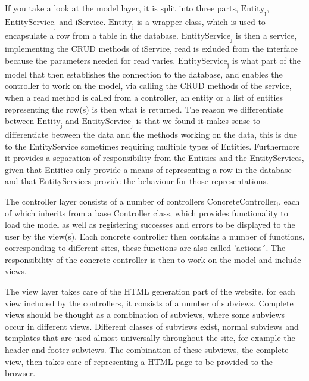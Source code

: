 \begin{description}[style=nextline]
	\item[Model Layer] 
	If you take a look at the model layer, it is split into three parts, $\text{Entity}_\text{j}$, $\text{EntityService}_\text{j}$ and iService.
	$\text{Entity}_\text{j}$ is a wrapper class, which is used to encapsulate a row from a table in the database.
	$\text{EntityService}_\text{j}$ is then a service, implementing the CRUD methods of iService, read is exluded from the interface because the parameters needed for read varies.
	$\text{EntityService}_\text{j}$ is what part of the model that then establishes the connection to the database, and enables the controller to work on the model, via calling the CRUD methods of the service, when a read method is called from a controller, an entity or a list of entities representing the row(s) is then what is returned.
	The reason we differentiate between  $\text{Entity}_\text{j}$ and $\text{EntityService}_\text{j}$ is that we found it makes sense to differentiate between the data and the methods working on the data, this is due to the EntityService sometimes requiring multiple types of Entities. 
    Furthermore it provides a separation of responsibility from the Entities and the EntityServices, given that Entities only provide a means of representing a row in the database and that EntityServices provide the behaviour for those representations.
	
	\item[Controller Layer]
	The controller layer consists of a number of controllers $\text{ConcreteController}_\text{i}$, each of which inherits from a base Controller class, which provides functionality to load the model as well as registering successes and errors to be displayed to the user by the view(s).
	Each concrete controller then contains a number of functions, corresponding to different sites, these functions are also called 'actions´. 
    The responsibility of the concrete controller is then to work on the model and include views. 
	
	\item[View Layer]
	The view layer takes care of the HTML generation part of the website, for each view included by the controllers, it consists of a number of subviews.
	Complete views should be thought as a combination of subviews, where some subviews occur in different views.
    Different classes of subviews exist, normal subviews and templates that are used almost universally throughout the site, for example the header and footer subviews.
	The combination of these subviews, the complete view, then takes care of representing a HTML page to be provided to the browser.
	

\end{description}

